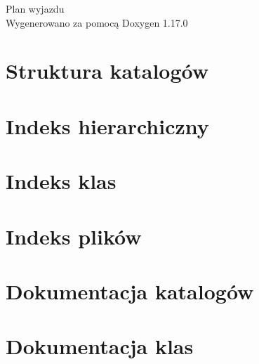 \documentclass[twoside]{book}
\newcommand{\+}{\discretionary{\mbox{\scriptsize$\hookleftarrow$}}{}{}}
\newcommand{\clearemptydoublepage}{%
    \newpage{\pagestyle{empty}\cleardoublepage}%
  }
\begin{document}
  \raggedbottom
    \hypersetup{pageanchor=false,
                bookmarksnumbered=true,
                pdfencoding=unicode
               }
  \begin{titlepage}
  \vspace*{7cm}
  \begin{center}%
  {\Large Plan wyjazdu}\\
  \vspace*{1cm}
  {\large Wygenerowano za pomocą Doxygen 1.17.0}\\
  \end{center}
  \end{titlepage}
  \clearemptydoublepage
  \tableofcontents
  \clearemptydoublepage
  \hypersetup{pageanchor=true}

\chapter{Struktura katalogów}

\chapter{Indeks hierarchiczny}

\chapter{Indeks klas}

\chapter{Indeks plików}

\chapter{Dokumentacja katalogów}




\chapter{Dokumentacja klas}












\end{document}
